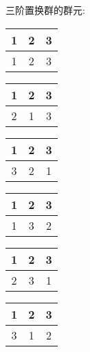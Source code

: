 \begin{example}
    三阶置换群的群元:
    
    \begin{center}
        \begin{tabular}{|c|c|c|}
            \hline
            1 & 2 & 3\\
            \hline
            1 & 2 & 3\\
            \hline
        \end{tabular}
        \quad
        \begin{tabular}{|c|c|c|}
            \hline
            1 & 2 & 3\\
            \hline
            2 & 1 & 3\\
            \hline
        \end{tabular}
        \quad
        \begin{tabular}{|c|c|c|}
            \hline
            1 & 2 & 3\\
            \hline
            3 & 2 & 1\\
            \hline
        \end{tabular}
       
        \vspace{1em}
        \begin{tabular}{|c|c|c|}
            \hline
            1 & 2 & 3\\
            \hline
            1 & 3 & 2\\
            \hline
        \end{tabular}
        \quad
        \begin{tabular}{|c|c|c|}
            \hline
            1 & 2 & 3\\
            \hline
            2 & 3 & 1\\
            \hline
        \end{tabular}
        \quad
        \begin{tabular}{|c|c|c|}
            \hline
            1 & 2 & 3\\
            \hline
            3 & 1 & 2\\
            \hline
        \end{tabular}
    \end{center}
\end{example}

